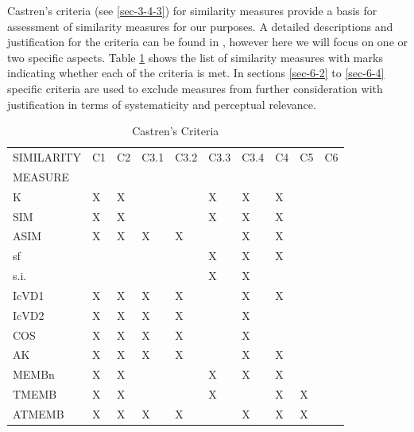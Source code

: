 \documentclass{article}
\begin{document}
Castren's criteria (see \ref{sec-3-4-3}) for similarity measures
provide a basis for assessment of similarity measures for our
purposes. A detailed descriptions and justification for the criteria
can be found in \citet[chap. 2]{Castren1994}, however here we will
focus on one or two specific aspects. Table  \ref{tab:criteria} shows the list
of similarity measures with marks indicating whether each of the
criteria is met. In sections \ref{sec-6-2} to \ref{sec-6-4} specific
criteria are used to exclude measures from further consideration with
justification in terms of systematicity and perceptual relevance.
\begin{table}[htb]
\caption{Castren's Criteria}\label{tab:criteria}
\begin{center}
\begin{tabular}{llllllllll}
\hline
 SIMILARITY  &  C1  &  C2  &  C3.1  &  C3.2  &  C3.3  &  C3.4  &  C4  &  C5  &  C6  \\
 MEASURE     &      &      &        &        &        &        &      &      &      \\
\hline
 K           &  X   &  X   &        &        &  X     &  X     &  X   &      &      \\
 SIM         &  X   &  X   &        &        &  X     &  X     &  X   &      &      \\
 ASIM        &  X   &  X   &  X     &  X     &        &  X     &  X   &      &      \\
 sf          &      &      &        &        &  X     &  X     &  X   &      &      \\
 s.i.        &      &      &        &        &  X     &  X     &      &      &      \\
 IcVD1       &  X   &  X   &  X     &  X     &        &  X     &  X   &      &      \\
 IcVD2       &  X   &  X   &  X     &  X     &        &  X     &      &      &      \\
 COS         &  X   &  X   &  X     &  X     &        &  X     &      &      &      \\
 AK          &  X   &  X   &  X     &  X     &        &  X     &  X   &      &      \\
 MEMBn       &  X   &  X   &        &        &  X     &  X     &  X   &      &      \\
 TMEMB       &  X   &  X   &        &        &  X     &        &  X   &  X   &      \\
 ATMEMB      &  X   &  X   &  X     &  X     &        &  X     &  X   &  X   &      \\

\end{tabular}
\end{center}
\end{table}
\end{document}
